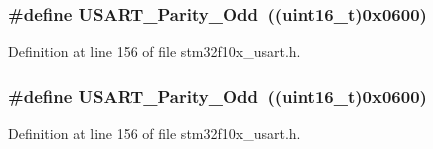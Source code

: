 \subsubsection[{\texorpdfstring{U\+S\+A\+R\+T\+\_\+\+Parity\+\_\+\+Odd}{USART_Parity_Odd}}]{\setlength{\rightskip}{0pt plus 5cm}\#define U\+S\+A\+R\+T\+\_\+\+Parity\+\_\+\+Odd~(({\bf uint16\+\_\+t})0x0600)}\hypertarget{group___u_s_a_r_t___parity_gafcd68937a6b4b8ffff8f96e68d6a5ecd}{}\label{group___u_s_a_r_t___parity_gafcd68937a6b4b8ffff8f96e68d6a5ecd}


Definition at line 156 of file stm32f10x\+\_\+usart.\+h.

\subsubsection[{\texorpdfstring{U\+S\+A\+R\+T\+\_\+\+Parity\+\_\+\+Odd}{USART_Parity_Odd}}]{\setlength{\rightskip}{0pt plus 5cm}\#define U\+S\+A\+R\+T\+\_\+\+Parity\+\_\+\+Odd~(({\bf uint16\+\_\+t})0x0600)}\hypertarget{group___u_s_a_r_t___parity_gafcd68937a6b4b8ffff8f96e68d6a5ecd}{}\label{group___u_s_a_r_t___parity_gafcd68937a6b4b8ffff8f96e68d6a5ecd}


Definition at line 156 of file stm32f10x\+\_\+usart.\+h.

